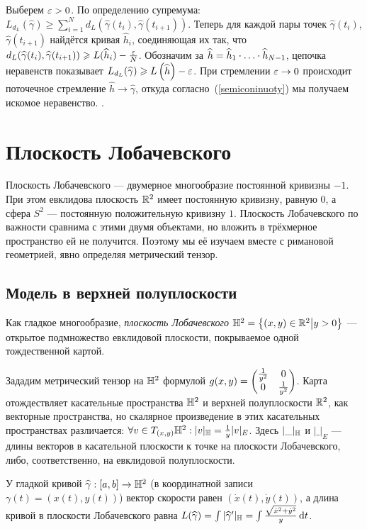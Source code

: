 \documentclass[a4paper]{report}
\begin{document}
{{{    Выберем $\varepsilon > 0$. По определению супремума: $L_{d_L}(\hat{\gamma}) \ge \sum\limits_{i = 1}^{N}d_L(\hat{\gamma}(t_i), \hat{\gamma}(t_{i+1}))$.
    Теперь для каждой пары точек $\hat{\gamma}(t_i)$, $\hat{\gamma}(t_{i+1})$ найдётся кривая $\hat{h}_i$, соединяющая их так, что $d_L(\widehat{\gamma}(t_i), \widehat{\gamma}(t_{i+1})) \geqslant L(\widehat{h}_i) - \frac{\varepsilon}{N}$.
    Обозначим за $\widehat{h} = \widehat{h}_1 \cdot\ldots\cdot \widehat{h}_{N-1}$, цепочка неравенств показывает $L_{d_L}(\widehat{\gamma}) \geqslant L\left(\widehat{h}\right) - \varepsilon$.
    При стремлении $\varepsilon \to 0$ происходит поточечное стремление $\hat{h} \to \hat{\gamma}$, откуда согласно~(\cref{semiconinuoty}) мы получаем искомое неравенство.
        .
    }
    }
    }
    \section{Плоскость Лобачевского}
    Плоскость Лобачевского --- двумерное многообразие постоянной кривизны $-1$.
    При этом евклидова плоскость $\mathbb{R}^2$ имеет постоянную кривизну, равную $0$, а сфера $S^2$ --- постоянную положительную кривизну $1$.
    Плоскость Лобачевского по важности сравнима с этими двумя объектами, но вложить в трёхмерное пространство ей не получится.
    Поэтому мы её изучаем вместе с римановой геометрией, явно определяя метрический тензор.
    \subsection{Модель в верхней полуплоскости}
    Как гладкое многообразие, \emph{плоскость Лобачевского} $\mathbb{H}^2 = \left\{(x, y) \in \mathbb{R}^2\middle|y > 0\right\}$ --- открытое подмножество евклидовой плоскости, покрываемое одной тождественной картой.

    Зададим метрический тензор на $\mathbb{H}^2$ формулой $g(x, y) = \begin{pmatrix}\frac{1}{y^2} & 0 \\ 0 & \frac{1}{y^2}\end{pmatrix}$.
    Карта отождествляет касательные пространства $\mathbb{H}^2$ и верхней полуплоскости $\mathbb{R}^2$, как векторные пространства, но скалярное произведение в этих касательных пространствах различается: $\forall v \in T_{(x, y)}\mathbb{H}^2: |v|_{\mathbb{H}} = \frac{1}{y}|v|_{E}$.
    Здесь $|\_|_{\mathbb{H}}$ и $|\_|_{E}$ --- длины векторов в касательной плоскости к точке на плоскости Лобачевского, либо, соответственно, на евклидовой полуплоскости.

    У гладкой кривой $\widehat{\gamma}: [a, b] \rightarrow \mathbb{H}^2$ (в координатной записи $\gamma(t) = (x(t), y(t))$) вектор скорости равен $(\dot{x}(t), \dot{y}(t))$, а длина кривой в плоскости Лобачевского равна $L(\widehat{\gamma}) = \int|\widehat{\gamma}'|_{\mathbb{H}} = \int\frac{\sqrt{\dot{x}^2 + \dot{y}^2}}{y}\operatorname{d}\! t$.
\end{document}
